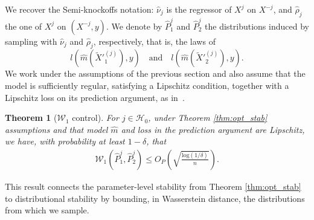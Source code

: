 \documentclass{article}
\theoremstyle{plain}
\newtheorem{theorem}{Theorem}[section]
\theoremstyle{definition}
\theoremstyle{remark}
\begin{document}

 
We recover the Semi-knockoffs notation: $\widehat{\nu}_j$ is the regressor of $X^j$ on $X^{-j}$, and $\widehat{\rho}_j$ the one of $X^j$ on $(X^{-j}, y)$. We denote by $\hat{P}_1^j$ and $\hat{P}_2^j$ the distributions induced by sampling with $\widehat{\nu}_j$ and $\widehat{\rho}_j$, respectively, that is, the laws of \[
l(\widehat{m}(\widetilde{X}'^{(j)}_1), y)
\quad\text{and}\quad
l(\widehat{m}(\widetilde{X}'^{(j)}_2), y).
\] We work under the assumptions of the previous section and also assume that the model is sufficiently regular, satisfying a Lipschitz condition, together with a Lipschitz loss on its prediction argument, as in~\citet{opt_error}.

 
 
 \begin{theorem}[$\mathcal{W}_1$ control]
 For $j \in \mathcal{H}_0$, under Theorem \ref{thm:opt_stab} assumptions and that model $\widehat{m}$ and loss in the prediction argument are Lipschitz, we have, with probability at least $1-\delta$, that
 \begin{align*}
     \mathcal{W}_1(\hat{P}_1^j, \hat{P}_2^j)\leq O_P\left(\sqrt{\frac{\mathrm{log}(1/\delta)}{n}}\right).
 \end{align*}\label{theo:W_1conv}
 \end{theorem}
%
 This result connects the parameter-level stability from Theorem \ref{thm:opt_stab} to distributional stability by bounding, in Wasserstein distance, the distributions from which we sample.
 
\end{document}
